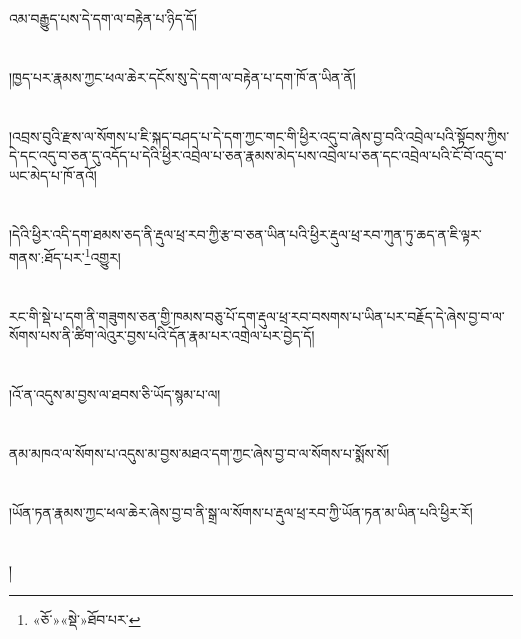 འམ་བརྒྱུད་པས་དེ་དག་ལ་བརྟེན་པ་ཉིད་དོ།\chapter{ }།ཁྱད་པར་རྣམས་ཀྱང་ཕལ་ཆེར་དངོས་སུ་དེ་དག་ལ་བརྟེན་པ་དག་ཁོ་ན་ཡིན་ནོ།\chapter{ }།འབྲས་བུའི་རྫས་ལ་སོགས་པ་ཇི་སྐད་བཤད་པ་དེ་དག་ཀྱང་གང་གི་ཕྱིར་འདུ་བ་ཞེས་བྱ་བའི་འབྲེལ་པའི་སྟོབས་ཀྱིས་དེ་དང་འདུ་བ་ཅན་དུ་འདོད་པ་དེའི་ཕྱིར་འབྲེལ་པ་ཅན་རྣམས་མེད་པས་འབྲེལ་པ་ཅན་དང་འབྲེལ་པའི་ངོ་བོ་འདུ་བ་ཡང་མེད་པ་ཁོ་ནའོ།\chapter{ }།དེའི་ཕྱིར་འདི་དག་ཐམས་ཅད་ནི་རྡུལ་ཕྲ་རབ་ཀྱི་རྩ་བ་ཅན་ཡིན་པའི་ཕྱིར་རྡུལ་ཕྲ་རབ་ཀུན་ཏུ་ཆད་ན་ཇི་ལྟར་གནས་:ཐོད་པར་\footnote{«ཅོ་»«སྡེ་»ཐོབ་པར་}འགྱུར།\chapter{ }རང་གི་སྡེ་པ་དག་ནི་གཟུགས་ཅན་གྱི་ཁམས་བཅུ་པོ་དག་རྡུལ་ཕྲ་རབ་བསགས་པ་ཡིན་པར་བརྗོད་དེ་ཞེས་བྱ་བ་ལ་སོགས་པས་ནི་ཚིག་ལེའུར་བྱས་པའི་དོན་རྣམ་པར་འགྲེལ་པར་བྱེད་དོ།\chapter{ }།འོ་ན་འདུས་མ་བྱས་ལ་ཐབས་ཅི་ཡོད་སྙམ་པ་ལ།\chapter{ }ནམ་མཁའ་ལ་སོགས་པ་འདུས་མ་བྱས་མཐའ་དག་ཀྱང་ཞེས་བྱ་བ་ལ་སོགས་པ་སྨོས་སོ།\chapter{ }།ཡོན་ཏན་རྣམས་ཀྱང་ཕལ་ཆེར་ཞེས་བྱ་བ་ནི་སྒྲ་ལ་སོགས་པ་རྡུལ་ཕྲ་རབ་ཀྱི་ཡོན་ཏན་མ་ཡིན་པའི་ཕྱིར་རོ།\chapter{ }།
